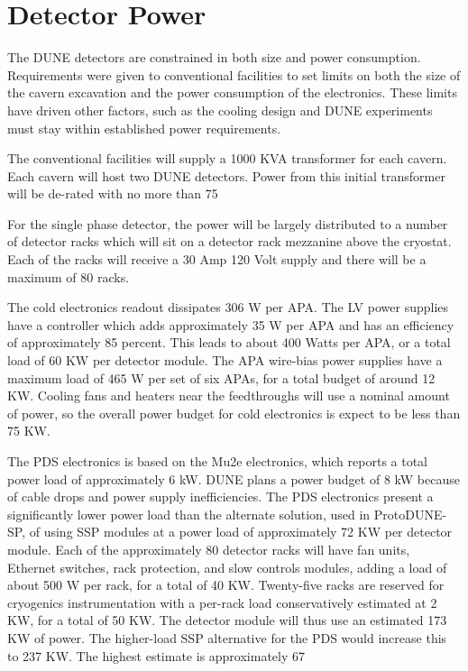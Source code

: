 \section{Detector Power}
\label{sec:fdsp-coord-faci-power}

The DUNE detectors are constrained in both size and power consumption.  Requirements were given to conventional facilities to set limits on both the size of the cavern excavation and the power consumption of the electronics.  These limits have driven other factors, such as the cooling design and DUNE experiments must stay within established power requirements.

The conventional facilities will supply a 1000 KVA transformer for each cavern.  Each cavern will host two DUNE detectors.  Power from this initial transformer will be de-rated with no more than 75%

For the single phase detector, the power will be largely distributed to a number of detector racks which will sit on a detector rack mezzanine above the cryostat.  Each of the racks will receive a 30 Amp 120 Volt supply and there will be a maximum of 80 racks.  

The cold electronics readout dissipates 306 W per APA. The LV power supplies have a controller which adds approximately 35 W per
APA and has an efficiency of approximately 85 percent. This leads to about 400 Watts
per APA, or a total load of 60 KW per detector module. The APA wire-bias power supplies
have a maximum load of 465 W per set of six APAs, for a total budget of around 12 KW. Cooling
fans and heaters near the feedthroughs will use a nominal amount of power, so the overall power
budget for cold electronics is expect to be less than 75 KW.

The PDS electronics is based on the Mu2e electronics, which reports a total power load of approximately
6 kW. DUNE plans a power budget of 8 kW because of cable drops and power supply inefficiencies.
The PDS electronics present a significantly lower power load than the alternate solution, used
in ProtoDUNE-SP, of using SSP modules at a power load of approximately 72 KW per detector
module.
Each of the approximately 80 detector racks will have fan units, Ethernet switches, rack protection,
and slow controls modules, adding a load of about 500 W per rack, for a total of 40 KW.
Twenty-five racks are reserved for cryogenics instrumentation with a per-rack load conservatively
estimated at 2 KW, for a total of 50 KW.
The detector module will thus use an estimated 173 KW of power. The higher-load SSP alternative
for the PDS would increase this to 237 KW. The highest estimate is approximately 67%

